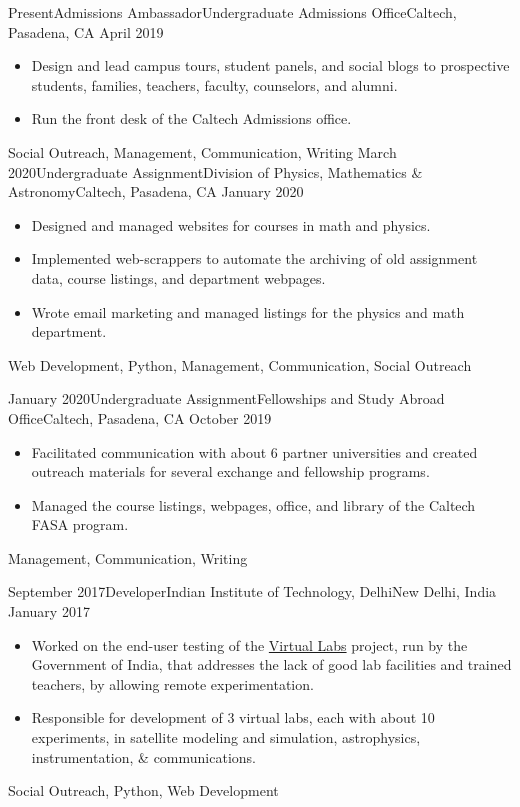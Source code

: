 \begin{experiences}
\experience
{Present}{Admissions Ambassador}{Undergraduate Admissions Office}{Caltech, Pasadena, CA}
{April 2019} {
\begin{itemize}
\item Design and lead campus tours, student panels, and social blogs to prospective students, families, teachers, faculty, counselors, and alumni.
\item Run the front desk of the Caltech Admissions office.
\end{itemize}
}
{Social Outreach, Management, Communication, Writing}
\emptySeparator
\experience
{March 2020}{Undergraduate Assignment}{Division of Physics, Mathematics \& Astronomy}{Caltech, Pasadena, CA}
{January 2020} {
\begin{itemize}
\item Designed and managed websites for courses in math and physics.
\item Implemented web-scrappers to automate the archiving of old assignment data, course listings, and department webpages.
\item Wrote email marketing and managed listings for the physics and math department.
\end{itemize}
}
{Web Development, Python, Management, Communication, Social Outreach}
\emptySeparator

\experience
{January 2020}{Undergraduate Assignment}{Fellowships and Study Abroad Office}{Caltech, Pasadena, CA}
{October 2019} {
\begin{itemize}
\item Facilitated communication with about 6 partner universities and created outreach materials for several exchange and fellowship programs.
\item Managed the course listings, webpages, office, and library of the Caltech FASA program.
\end{itemize}
}
{Management, Communication, Writing}
\emptySeparator

\experience
{September 2017}{Developer}{Indian Institute of Technology, Delhi}{New Delhi, India}
{January 2017} {
 
\begin{itemize}
\item Worked on the end-user testing of the \href{https://vlabs.co.in/}{Virtual Labs} project, run by the Government of India, that addresses the lack of good lab facilities and trained
teachers, by allowing remote experimentation.
\item Responsible for development of 3 virtual labs, each with about 10 experiments, in satellite modeling and simulation, astrophysics, instrumentation, \& communications. 
\end{itemize}
}
{Social Outreach, Python, Web Development}
\emptySeparator


\end{experiences}
